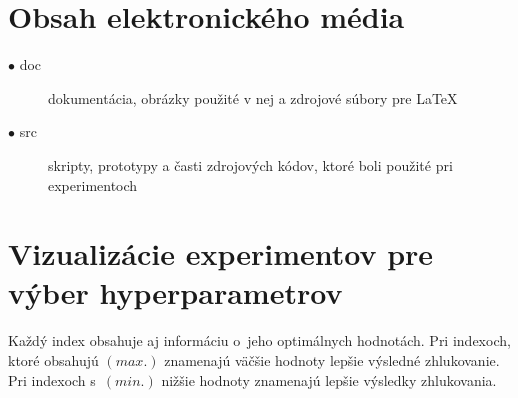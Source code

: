 \documentclass[a4paper,twoside,slovak,12pt,appendix]{article}
\begin{document}
\begin{appendices}
\newpage
\section{Obsah elektronického média}

\begin{description}
  \item[$\bullet$ doc] dokumentácia, obrázky použité v nej a zdrojové súbory pre LaTeX
  \item[$\bullet$ src] skripty, prototypy a časti zdrojových kódov, ktoré boli použité pri experimentoch
\end{description}


\newpage
\section{Vizualizácie experimentov pre výber hyperparametrov}
\label{c:clustering-hyperparameters-experiments}
Každý index obsahuje aj informáciu o~jeho optimálnych hodnotách. Pri indexoch,
ktoré obsahujú $(max.)$ znamenajú väčšie hodnoty lepšie výsledné zhlukovanie.
Pri indexoch s~$(min.)$ nižšie hodnoty znamenajú lepšie výsledky zhlukovania.


\end{appendices}
\end{document}

